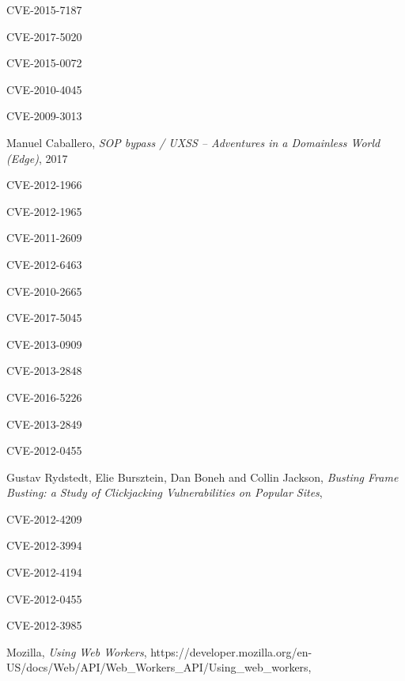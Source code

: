 \documentclass[journal]{IEEEtran}
\begin{document}
\begin{thebibliography}{1}
CVE-2015-7187

CVE-2017-5020

CVE-2015-0072

CVE-2010-4045

CVE-2009-3013

Manuel Caballero,
\textit{SOP bypass / UXSS – Adventures in a Domainless World (Edge)},
2017

CVE-2012-1966

CVE-2012-1965

CVE-2011-2609

CVE-2012-6463

CVE-2010-2665

CVE-2017-5045

CVE-2013-0909

CVE-2013-2848

CVE-2016-5226

CVE-2013-2849

CVE-2012-0455

Gustav Rydstedt, Elie Bursztein, Dan Boneh and Collin Jackson,
\textit{Busting Frame Busting:
a Study of Clickjacking Vulnerabilities on Popular Sites},

CVE-2012-4209

CVE-2012-3994

CVE-2012-4194

CVE-2012-0455

CVE-2012-3985

Mozilla,
\textit{Using Web Workers},
https://developer.mozilla.org/en-US/docs/Web/API/Web\_Workers\_API/Using\_web\_workers,


\end{thebibliography}

\ifCLASSOPTIONcaptionsoff
  \newpage
\fi



\end{document}
